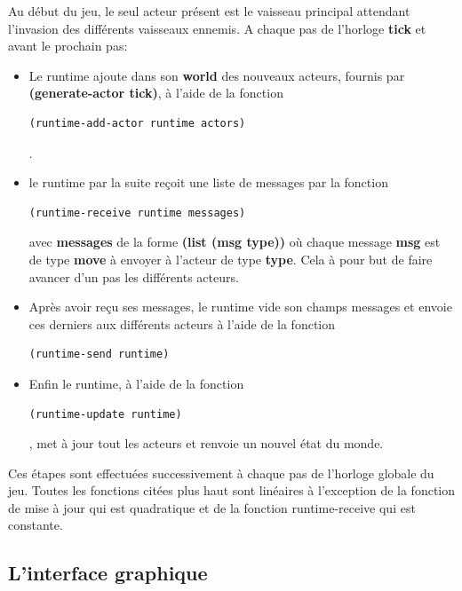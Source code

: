 Au début du jeu, le seul acteur présent est le vaisseau principal attendant l'invasion des différents vaisseaux ennemis. A chaque pas de l'horloge \textbf{tick} et avant le prochain pas:
\begin{itemize}
    \item Le runtime ajoute dans son \textbf{world} des nouveaux acteurs, fournis par \textbf{(generate-actor tick)}, à l'aide de la fonction 
    \begin{lstlisting}[language={lisp},captionpos=b, frame=single]
    (runtime-add-actor runtime actors)
    \end{lstlisting}.
    
    \item le runtime par la suite reçoit une liste de messages  par la fonction 
    \begin{lstlisting}[language={lisp},captionpos=b, frame=single]
    (runtime-receive runtime messages)
    \end{lstlisting} avec \textbf{messages} de la forme \textbf{(list (msg type))} où chaque message \textbf{msg} est de type \textbf{move} à envoyer à l'acteur de type \textbf{type}. Cela à pour but de faire avancer d'un pas les différents acteurs.
    
    \item Après avoir reçu ses messages, le runtime vide son champs messages et envoie ces derniers aux différents acteurs à l'aide de la fonction 
    \begin{lstlisting}[language={lisp},captionpos=b, frame=single]
    (runtime-send runtime)
    \end{lstlisting}
    
    \item Enfin le runtime, à l'aide de la fonction
    \begin{lstlisting}[language={lisp},captionpos=b, frame=single]
    (runtime-update runtime)
    \end{lstlisting}, met à jour tout les acteurs et renvoie un nouvel état du monde.
\end{itemize}
Ces étapes sont effectuées successivement à chaque pas de l'horloge globale du jeu.
Toutes les fonctions citées plus haut sont linéaires à l'exception de la fonction de mise à jour qui est quadratique et de la fonction runtime-receive qui est constante.


\subsection{L'interface graphique}


